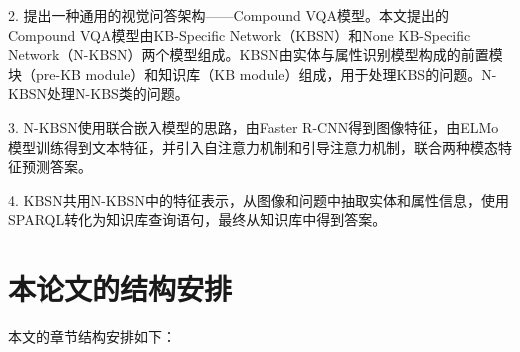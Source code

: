 2. 提出一种通用的视觉问答架构——Compound VQA模型。本文提出的Compound VQA模型由KB-Specific Network（KBSN）和None KB-Specific Network（N-KBSN）两个模型组成。KBSN由实体与属性识别模型构成的前置模块（pre-KB module）和知识库（KB module）组成，用于处理KBS的问题。N-KBSN处理N-KBS类的问题。

3. N-KBSN使用联合嵌入模型的思路，由Faster R-CNN得到图像特征，由ELMo模型训练得到文本特征，并引入自注意力机制和引导注意力机制，联合两种模态特征预测答案。

4. KBSN共用N-KBSN中的特征表示，从图像和问题中抽取实体和属性信息，使用SPARQL转化为知识库查询语句，最终从知识库中得到答案。

\section{本论文的结构安排}
本文的章节结构安排如下：
